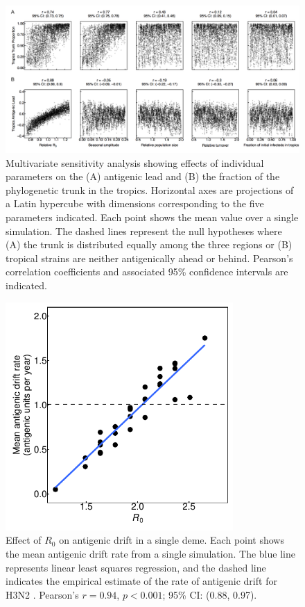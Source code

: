 \documentclass[10pt]{article}
\begin{document}
\newpage
\begin{figure}[h!]
\centerline{\includegraphics[width=7in]{./manuscript/figures/LHS_summary/LHS_summary.pdf}}
\caption{Multivariate sensitivity analysis showing effects of individual parameters on the (A) antigenic lead and (B) the fraction of the phylogenetic trunk in the tropics. 
Horizontal axes are projections of a Latin hypercube with dimensions corresponding to the five parameters indicated. 
Each point shows the mean value over a single simulation. 
The dashed lines represent the null hypotheses where (A) the trunk is distributed equally among the three regions or (B) tropical strains are neither antigenically ahead or behind. 
Pearson's correlation coefficients and associated 95\% confidence intervals are indicated.}
\label{fig:LHS_summary}
\end{figure}

\newpage
\begin{figure}[h!]
\centerline{\includegraphics[width=3.42in]{./manuscript/figures/R0_drift/R0_drift.pdf}}
\caption{Effect of $R_0$ on antigenic drift in a single deme. 
Each point shows the mean antigenic drift rate from a single simulation. 
The blue line represents linear least squares regression, and the dashed line indicates the empirical estimate of the rate of antigenic drift for H3N2 \cite{Bedford:2014bf}. 
Pearson's $r = 0.94$, $p < 0.001$; 95\% CI: (0.88, 0.97).}
\label{fig:R0_drift}
\end{figure}
\end{document}
